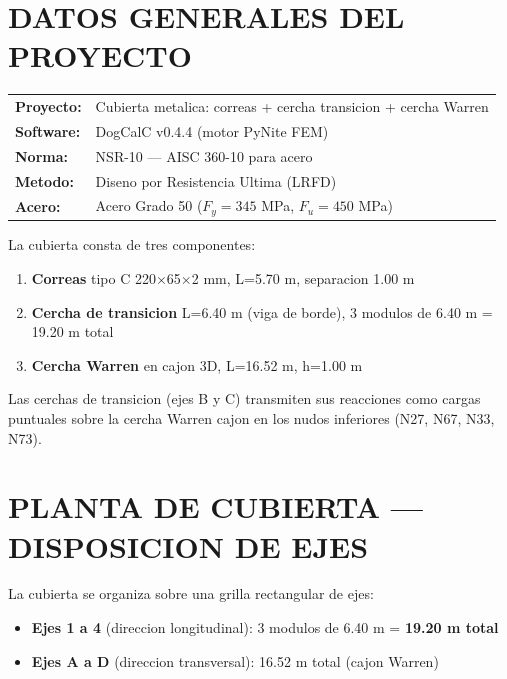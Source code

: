 \documentclass[12pt,a4paper]{article}
\begin{document}
\section{DATOS GENERALES DEL PROYECTO}
\begin{center}
\begin{tabular}{>{\sffamily\color{primary!80}}l >{\sffamily}l}
\textbf{Proyecto:}   & Cubierta metalica: correas + cercha transicion + cercha Warren \\
\textbf{Software:}   & DogCalC v0.4.4 (motor PyNite FEM) \\
\textbf{Norma:}      & NSR-10 --- AISC 360-10 para acero \\
\textbf{Metodo:}     & Diseno por Resistencia Ultima (LRFD) \\
\textbf{Acero:}      & Acero Grado 50 ($F_y=345$ MPa, $F_u=450$ MPa) \\
\end{tabular}
\end{center}

La cubierta consta de tres componentes:
\begin{enumerate}
    \item \textbf{Correas} tipo C 220$\times$65$\times$2 mm, L=5.70 m, separacion 1.00 m
    \item \textbf{Cercha de transicion} L=6.40 m (viga de borde), 3 modulos de 6.40 m = 19.20 m total
    \item \textbf{Cercha Warren} en cajon 3D, L=16.52 m, h=1.00 m
\end{enumerate}

Las cerchas de transicion (ejes B y C) transmiten sus reacciones como cargas puntuales
sobre la cercha Warren cajon en los nudos inferiores (N27, N67, N33, N73).
\vspace{0.5cm}

\section{PLANTA DE CUBIERTA — DISPOSICION DE EJES}
La cubierta se organiza sobre una grilla rectangular de ejes:
\begin{itemize}
    \item \textbf{Ejes 1 a 4} (direccion longitudinal): 3 modulos de 6.40 m = \textbf{19.20 m total}
    \item \textbf{Ejes A a D} (direccion transversal): 16.52 m total (cajon Warren)
\end{itemize}
\end{document}
